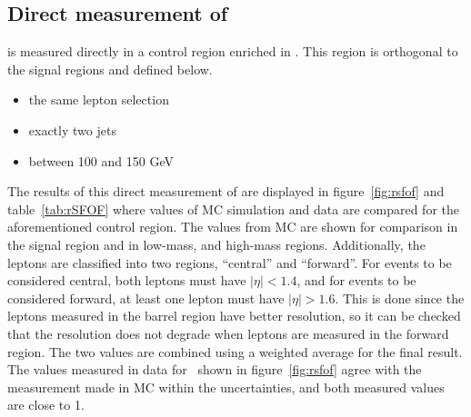 \subsection{Direct measurement of \texorpdfstring{\rsfof}{Rsfof}}
\label{ssec:rsfofDirect}
\rsfof is measured directly in a control region enriched in \ttbar.
This region is orthogonal to the signal regions and defined below.

\begin{itemize}
\item the same lepton selection
\item exactly two jets
\item \met between 100 and 150 GeV
\end{itemize}

The results of this direct measurement of \rsfof are displayed in figure~\ref{fig:rsfof} and table~\ref{tab:rSFOF}
where values of MC simulation and data are compared for the aforementioned control region.
The values from \ttbar MC are shown for comparison in the signal region and in low-mass, and high-mass regions.
Additionally, the leptons are classified into two regions, ``central'' and ``forward''.
For events to be considered central, both leptons must have $|\eta| < 1.4$,
and for events to be considered forward, at least one lepton must have $|\eta| > 1.6$.
This is done since the leptons measured in the barrel region have better resolution,
so it can be checked that the resolution does not degrade when leptons are measured in the forward region.
The two values are combined using a weighted average for the final result.
The values measured in data for \rsfof\ shown in figure~\ref{fig:rsfof} agree with the measurement made in MC within the uncertainties,
and both measured values are close to 1.

